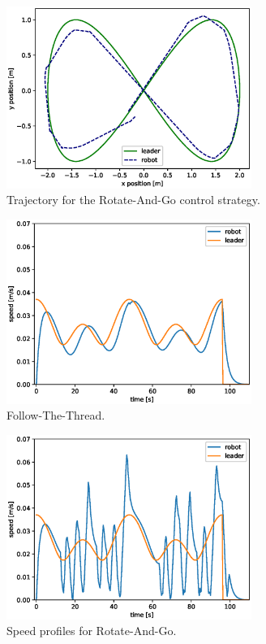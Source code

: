 \documentclass[journal]{IEEEtran}
\begin{document}
\begin{figure}[h!]
\centering
\includegraphics[width=8cm]{images/rgv_cv20_cr20_dr10.eps}
\caption{Trajectory for the Rotate-And-Go control strategy.}
\label{fig:distance_sim}
\end{figure}

\begin{figure}[h!]
\centering
\includegraphics[width=8cm]{images/ft_cv15_cr10_leader_robot_speed.eps}
\caption{Follow-The-Thread.}
\label{fig:distance_sim}
\end{figure}

\begin{figure}[h!]
\centering
\includegraphics[width=8cm]{images/rg_cv20_cr20_bv10_dtoff10_leader_robot_speed.eps}
\caption{Speed profiles for Rotate-And-Go.}
\label{fig:distance_sim}
\end{figure}
\end{document}
